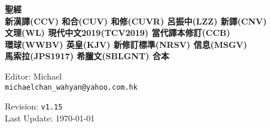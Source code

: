 \documentclass{book}
\author{
  Editor, Michael Chan\\
  \texttt{michaelchan\_wahyan@yahoo.com.hk}
}
\begin{document}
\clearpage
\newcommand\nbvspace[1][3]{\vspace*{\stretch{#1}}}
\newcommand\nbstretchyspace{\spaceskip0.5em plus 0.25em minus 0.25em}
\newcommand{\nbtitlestretch}{\spaceskip0.6em}
\pagestyle{empty}
\begin{center}
\bfseries
\nbvspace[1]
\Huge
{%
\Large
\textbf{聖經 \\
       新漢譯(CCV) 和合(CUV) 和修(CUVR) 呂振中(LZZ) 新譯(CNV) \\
       文理(WL) 現代中文2019(TCV2019) 當代譯本修訂(CCB) \\
       環球(WWBV) 英皇(KJV) 新修訂標準(NRSV) 信息(MSGV) \\
       馬索拉(JPS1917) 希臘文(SBLGNT) 合本 \\
       }}

\nbvspace[1]

{\large
Editor: Michael\\
\texttt{michaelchan\_wahyan@yahoo.com.hk}
}

\nbvspace[1]

{\large
Revision: \texttt{v1.15}\\
Last Update: \today
}


\vfill
\begin{tikzpicture}
\end{tikzpicture}
\vfill

\end{center}

\newpage

\setcounter{tocdepth}{0}
\dominitoc
\begin{multicols}{3}
\tableofcontents
\end{multicols}

\large

\end{document}
